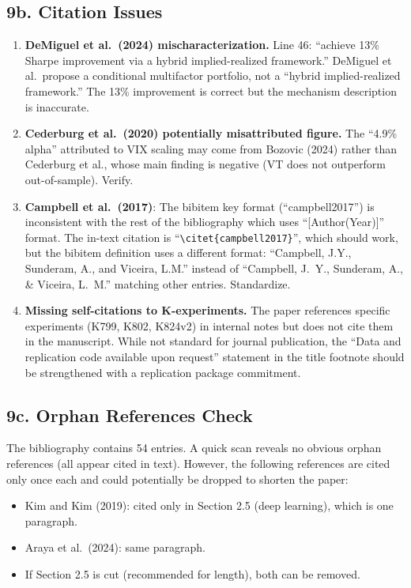 \documentclass[12pt,a4paper]{article}
\begin{document}
\subsection*{9b. Citation Issues}

\begin{enumerate}[nosep]
\item \textcolor{warncolor}{\textbf{DeMiguel et al.\ (2024) mischaracterization.}} Line 46: ``achieve 13\% Sharpe improvement via a hybrid implied-realized framework.'' DeMiguel et al.\ propose a conditional multifactor portfolio, not a ``hybrid implied-realized framework.'' The 13\% improvement is correct but the mechanism description is inaccurate.
\item \textcolor{warncolor}{\textbf{Cederburg et al.\ (2020) potentially misattributed figure.}} The ``4.9\% alpha'' attributed to VIX scaling may come from Bozovic (2024) rather than Cederburg et al., whose main finding is negative (VT does not outperform out-of-sample). Verify.
\item \textbf{Campbell et al.\ (2017)}: The bibitem key format (``campbell2017'') is inconsistent with the rest of the bibliography which uses ``[Author(Year)]'' format. The in-text citation is ``\texttt{\textbackslash citet\{campbell2017\}}'', which should work, but the bibitem definition uses a different format: ``Campbell, J.Y., Sunderam, A., and Viceira, L.M.'' instead of ``Campbell, J.~Y., Sunderam, A., \& Viceira, L.~M.'' matching other entries. Standardize.
\item \textbf{Missing self-citations to K-experiments.} The paper references specific experiments (K799, K802, K824v2) in internal notes but does not cite them in the manuscript. While not standard for journal publication, the ``Data and replication code available upon request'' statement in the title footnote should be strengthened with a replication package commitment.
\end{enumerate}

\subsection*{9c. Orphan References Check}

The bibliography contains 54 entries. A quick scan reveals no obvious orphan references (all appear cited in text). However, the following references are cited only once each and could potentially be dropped to shorten the paper:

\begin{itemize}[nosep]
\item Kim and Kim (2019): cited only in Section 2.5 (deep learning), which is one paragraph.
\item Araya et al.\ (2024): same paragraph.
\item If Section 2.5 is cut (recommended for length), both can be removed.
\end{itemize}
\end{document}
